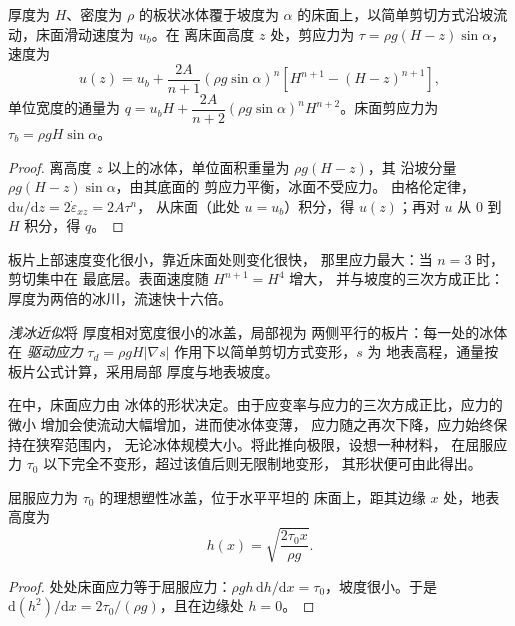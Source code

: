 \begin{theorem}[平行边板状冰体的流动]\label{thm:b3:glaciology:slab}
厚度为 $H$、密度为 $\rho$ 的板状冰体覆于坡度为
$\alpha$ 的床面上，以简单剪切方式沿坡流动，床面滑动速度为 $u_b$。在
离床面高度 $z$ 处，剪应力为 $\tau = \rho g(H - z)\sin\alpha$，
速度为
\[
u(z) = u_b + \frac{2A}{n + 1}(\rho g\sin\alpha)^n\left[H^{n+1} - (H -
z)^{n+1}\right],
\]
单位宽度的通量为 $q = u_bH + \dfrac{2A}{n + 2}(\rho
g\sin\alpha)^nH^{n+2}$。床面剪应力为 $\tau_b = \rho gH\sin\alpha$。
\end{theorem}

\begin{proof}
离高度 $z$ 以上的冰体，单位面积重量为 $\rho g(H - z)$，其
沿坡分量 $\rho g(H - z)\sin\alpha$，由其底面的
剪应力平衡，冰面不受应力。
由格伦定律，$\mathrm du/\mathrm dz = 2\dot\varepsilon_{xz} = 2A\tau^n$，
从床面（此处 $u = u_b$）积分，得 $u(z)$；再对 $u$ 从 0 到 $H$
积分，得 $q$。
\end{proof}

板片上部速度变化很小，靠近床面处则变化很快，
那里应力最大：当 $n = 3$ 时，剪切集中在
最底层。表面速度随 $H^{n+1} = H^4$ 增大，
并与坡度的三次方成正比：厚度为两倍的冰川，流速快十六倍。

\begin{definition}[浅冰近似]\label{def:b3:glaciology:sia}
\emph{浅冰近似}将
厚度相对宽度很小的冰盖，局部视为
两侧平行的板片：每一处的冰体在
\emph{驱动应力} $\tau_d = \rho gH|\nabla s|$ 作用下以简单剪切方式变形，$s$ 为
地表高程，通量按板片公式计算，采用局部
厚度与地表坡度。
\end{definition}

在中，床面应力由
冰体的形状决定。由于应变率与应力的三次方成正比，应力的微小
增加会使流动大幅增加，进而使冰体变薄，
应力随之再次下降，应力始终保持在狭窄范围内，
无论冰体规模大小。将此推向极限，设想一种材料，
在屈服应力 $\tau_0$ 以下完全不变形，超过该值后则无限制地变形，
其形状便可由此得出。

\begin{proposition}[理想塑性冰盖剖面]\label{prop:b3:glaciology:nye}
屈服应力为 $\tau_0$ 的理想塑性冰盖，位于水平平坦的
床面上，距其边缘 $x$ 处，地表高度为
\[
h(x) = \sqrt{\frac{2\tau_0x}{\rho g}} .
\]
\end{proposition}

\begin{proof}
处处床面应力等于屈服应力：$\rho gh\,\mathrm
dh/\mathrm dx = \tau_0$，坡度很小。于是 $\mathrm d(h^2)/\mathrm
dx = 2\tau_0/(\rho g)$，且在边缘处 $h = 0$。
\end{proof}


